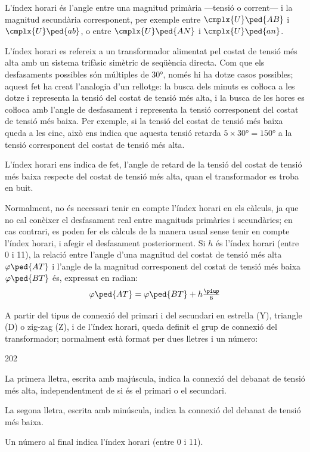 L'índex horari és l'angle entre una magnitud  primària ---tensió o corrent--- i la magnitud secundària corresponent, per exemple entre $\cmplx{U}\ped{AB}$ i $\cmplx{U}\ped{ab}$, o entre $\cmplx{U}\ped{AN}$ i $\cmplx{U}\ped{an}$.

L'índex horari es refereix a un transformador alimentat pel costat de tensió més alta  amb un sistema trifàsic simètric de seqüència directa. Com que els desfasaments possibles són múltiples de \ang{30}, només hi ha dotze casos possibles; aquest fet ha creat l'analogia d'un rellotge: la busca dels minuts es coŀloca a les dotze i representa la tensió del costat de tensió més alta, i la busca de les hores es coŀloca amb l'angle de desfasament i representa la tensió corresponent del costat de tensió més baixa. Per exemple, si la tensió del costat de tensió més baixa queda a les cinc, això ens indica que aquesta tensió retarda $5\times \ang{30}= \ang{150}$ a la tensió corresponent del costat de tensió més alta.

L'índex horari ens indica de fet, l'angle de retard de la tensió del costat de tensió més baixa respecte del costat de tensió més alta, quan el transformador es troba en buit.

Normalment, no és necessari tenir en compte l'índex horari en els càlculs, ja que no cal conèixer el desfasament real entre magnituds primàries i secundàries; en cas contrari, es poden fer els càlculs de la manera usual sense tenir en compte l'índex horari, i afegir el desfasament posteriorment. Si $h$ és l'índex horari (entre 0 i 11), la relació entre l'angle d'una magnitud del costat de tensió més alta $\varphi\ped{AT}$ i l'angle de la magnitud corresponent del costat de tensió més baixa $\varphi\ped{BT}$ és, expressat en radian:
\begin{equation}
    \varphi\ped{AT} = \varphi\ped{BT} + h\tfrac{\piup}{6}\label{eq:fi-AT-BT}
\end{equation}


A partir del tipus de connexió del primari i del secundari en estrella (Y), triangle (D) o zig-zag (Z), i de l'índex horari, queda definit el grup de connexió del transformador; normalment està format per dues lletres i un número:
\begin{dingautolist}{202}
   \item La primera lletra, escrita amb majúscula, indica la connexió del debanat de tensió més alta, independentment de si és el primari o el secundari.
   \item La segona lletra, escrita amb minúscula, indica la connexió del debanat de tensió més baixa.
   \item Un número al final indica l'índex horari (entre 0 i 11).
\end{dingautolist}

